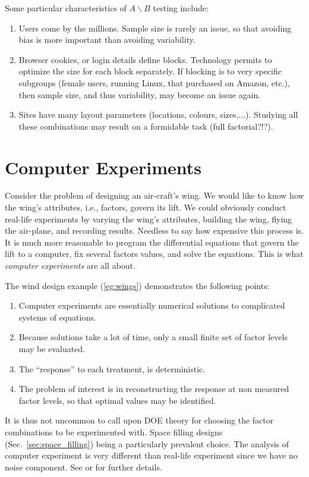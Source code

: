 Some particular characteristics of $A\backslash B$ testing include:
\begin{enumerate}
\item Users come by the millions. Sample size is rarely an issue, so that avoiding bias is more important than avoiding variability.
\item Browser cookies, or login details define blocks. Technology permits to optimize the size for each block separately. If blocking is to very specific subgroups (female users, running Linux, that purchased on Amazon, etc.), then sample size, and thus variability, may become an issue again.
\item Sites have many layout parameters (locations, colours, sizes,...). Studying all these combinations may result on a formidable task (full factorial?!?).
\end{enumerate}




\section{Computer Experiments}
\begin{example}
\label{eg:wings}
Consider the problem of designing an air-craft's wing.
We would like to know how the wing's attributes, i.e., factors, govern its lift.
We could obviously conduct real-life experiments by varying the wing's attributes, building the wing, flying the air-plane, and recording results. 
Needless to say how expensive this process is.
It is much more reasonable to program the differential equations that govern the lift to a computer, fix several factors values, and solve the equations.
This is what \emph{computer experiments} are all about. 
\end{example}


The wind design example (\ref{eg:wings}) demonstrates the following points:
\begin{enumerate}
\item Computer experiments are essentially numerical solutions to complicated systems of equations.
\item Because solutions take a lot of time, only a small finite set of factor levels may be evaluated. 
\item The ``response'' to each treatment, is deterministic. 
\item The problem of interest is in reconstructing the response at non measured factor levels, so that optimal values may be identified. 
\end{enumerate}
It is thus not uncommon to call upon DOE theory for choosing the factor combinations to be experimented with. Space filling designs (Sec.~\ref{sec:space_filling}) being a particularly prevalent choice. 
The analysis of computer experiment is very different than real-life experiment since we have no noise component. 
See \cite{sacks_design_1989} or \cite{santner_design_2013} for further details. 






